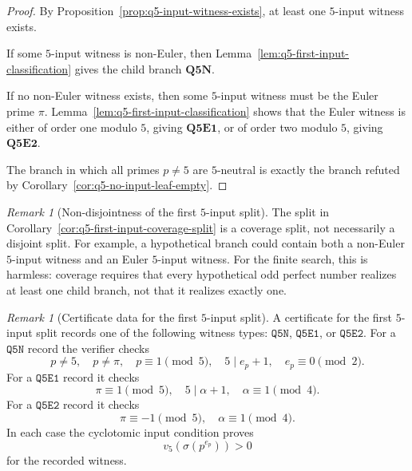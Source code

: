 \documentclass[11pt]{article}
\theoremstyle{definition}
\theoremstyle{remark}
\newtheorem{remark}[theorem]{Remark}
\begin{document}
\begin{proof}
By Proposition~\ref{prop:q5-input-witness-exists}, at least one $5$-input
witness exists.

If some $5$-input witness is non-Euler, then
Lemma~\ref{lem:q5-first-input-classification} gives the child branch
\(\mathbf{Q5N}\).

If no non-Euler witness exists, then some $5$-input witness must be the Euler
prime $\pi$.  Lemma~\ref{lem:q5-first-input-classification} shows that the Euler
witness is either of order one modulo \(5\), giving \(\mathbf{Q5E1}\), or of
order two modulo \(5\), giving \(\mathbf{Q5E2}\).

The branch in which all primes $p\ne5$ are $5$-neutral is exactly the branch
refuted by Corollary~\ref{cor:q5-no-input-leaf-empty}.
\end{proof}

\begin{remark}[Non-disjointness of the first $5$-input split]
The split in Corollary~\ref{cor:q5-first-input-coverage-split} is a coverage
split, not necessarily a disjoint split.  For example, a hypothetical branch
could contain both a non-Euler $5$-input witness and an Euler $5$-input witness.
For the finite search, this is harmless: coverage requires that every
hypothetical odd perfect number realizes at least one child branch, not that it
realizes exactly one.
\end{remark}

\begin{remark}[Certificate data for the first $5$-input split]
A certificate for the first $5$-input split records one of the following witness
types: \(\mathtt{Q5N}\), \(\mathtt{Q5E1}\), or \(\mathtt{Q5E2}\).
For a \(\mathtt{Q5N}\) record the verifier checks
\[
  p\ne5,\quad p\ne\pi,\quad p\equiv1\pmod5,\quad 5\mid e_p+1,
  \quad e_p\equiv0\pmod2.
\]
For a \(\mathtt{Q5E1}\) record it checks
\[
  \pi\equiv1\pmod5,\quad 5\mid\alpha+1,\quad \alpha\equiv1\pmod4.
\]
For a \(\mathtt{Q5E2}\) record it checks
\[
  \pi\equiv-1\pmod5,\quad \alpha\equiv1\pmod4.
\]
In each case the cyclotomic input condition proves
\[
  v_5(\sigma(p^{e_p}))>0
\]
for the recorded witness.
\end{remark}
\end{document}
